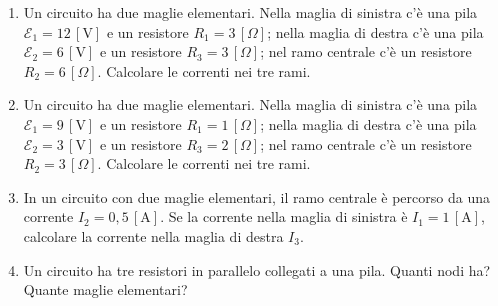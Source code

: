 \begin{enumerate}[leftmargin=1cm]
  \item Un circuito ha due maglie elementari. Nella maglia di sinistra c'è una pila \(\mathcal{E}_1 = 12\,[\text{V}]\) e un resistore \(R_1 = 3\,[\Omega]\); nella maglia di destra c'è una pila \(\mathcal{E}_2 = 6\,[\text{V}]\) e un resistore \(R_3 = 3\,[\Omega]\); nel ramo centrale c'è un resistore \(R_2 = 6\,[\Omega]\). Calcolare le correnti nei tre rami.
  \item Un circuito ha due maglie elementari. Nella maglia di sinistra c'è una pila \(\mathcal{E}_1 = 9\,[\text{V}]\) e un resistore \(R_1 = 1\,[\Omega]\); nella maglia di destra c'è una pila \(\mathcal{E}_2 = 3\,[\text{V}]\) e un resistore \(R_3 = 2\,[\Omega]\); nel ramo centrale c'è un resistore \(R_2 = 3\,[\Omega]\). Calcolare le correnti nei tre rami.
  \item In un circuito con due maglie elementari, il ramo centrale è percorso da una corrente \(I_2 = 0{,}5\,[\text{A}]\). Se la corrente nella maglia di sinistra è \(I_1 = 1\,[\text{A}]\), calcolare la corrente nella maglia di destra \(I_3\).
  \item Un circuito ha tre resistori in parallelo collegati a una pila. Quanti nodi ha? Quante maglie elementari? 
\end{enumerate}